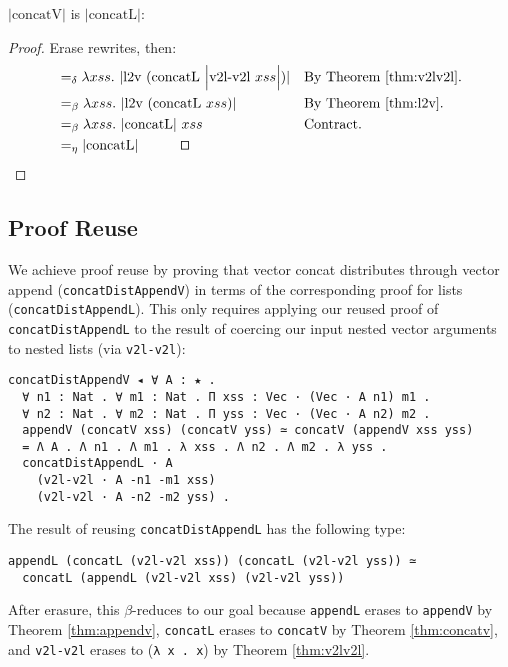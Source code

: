 \documentclass[a4paper,envcountsame,envcountsect]{llncs}
\newcommand{\eqed}[0]{\tag*{\qed}}
\newcommand{\labsec}[1]{\label{sec:#1}}
\newcommand{\refthm}[1]{Theorem \ref{thm:#1}}
\newcommand{\labthm}[1]{\label{thm:#1}}
\newcommand{\earg}[1]{\,\,#1}
\newcommand{\erase}[1]{\ensuremath{\lvert #1 \rvert}}
\newcommand{\Erase}[1]{\ensuremath{\Big\lvert #1 \Big\rvert}}
\newcommand{\fun}[1]{\lambda #1 .~}
\newcommand{\by}[1]{\text{#1}}
\newcommand{\name}[1]{\textrm{#1}}
\begin{document}
\begin{theorem}
\erase{\name{concatV}} is \erase{\name{concatL}}:
\labthm{concatv}
\end{theorem}

\begin{proof}
{\small
  Erase rewrites, then:
\begin{align*}
  &=_\delta \fun{xss} \erase{
    \name{l2v} \earg (\name{concatL} \earg \Erase{\name{v2l-v2l} \earg xss})
  }
  && \by{By \refthm{v2lv2l}.}
  \\
  &=_\beta \fun{xss} \erase{
    \name{l2v} \earg (\name{concatL} \earg xss)
  }
  && \by{By \refthm{l2v}.}
  \\
  &=_\beta \fun{xss} \erase{\name{concatL}} \earg xss
  && \by{Contract.}
  \\
  &=_\eta \erase{\name{concatL}}
  \eqed
\end{align*}
}
\end{proof}

\subsection{Proof Reuse}
\labsec{nestreuse:proofreuse}

We achieve proof reuse by proving that vector concat distributes
through vector append (\texttt{concatDistAppendV})
in terms of the corresponding proof for lists
(\texttt{concatDistAppendL}). This only requires applying our reused
proof of \texttt{concatDistAppendL} to the result of coercing
our input nested vector arguments to nested lists
(via \texttt{v2l-v2l}):

\begin{verbatim}
concatDistAppendV ◂ ∀ A : ★ .
  ∀ n1 : Nat . ∀ m1 : Nat . Π xss : Vec · (Vec · A n1) m1 .
  ∀ n2 : Nat . ∀ m2 : Nat . Π yss : Vec · (Vec · A n2) m2 .
  appendV (concatV xss) (concatV yss) ≃ concatV (appendV xss yss)
  = Λ A . Λ n1 . Λ m1 . λ xss . Λ n2 . Λ m2 . λ yss .
  concatDistAppendL · A
    (v2l-v2l · A -n1 -m1 xss)
    (v2l-v2l · A -n2 -m2 yss) .
\end{verbatim}

The result of reusing \texttt{concatDistAppendL} has the following type:
\begin{verbatim}
appendL (concatL (v2l-v2l xss)) (concatL (v2l-v2l yss)) ≃
  concatL (appendL (v2l-v2l xss) (v2l-v2l yss))
\end{verbatim}

After erasure, this $\beta$-reduces to our goal because
\texttt{appendL} erases to \texttt{appendV} by
\refthm{appendv},
\texttt{concatL} erases to \texttt{concatV} by
\refthm{concatv},
and \texttt{v2l-v2l} erases to (\texttt{λ x . x})
by \refthm{v2lv2l}.
\end{document}
